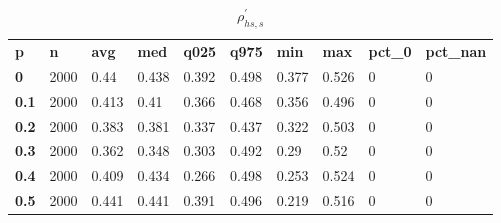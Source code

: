 \begin{table}[h]
 \centering 
\footnotesize
\caption{$\rho_{hs,s}^\prime $}
\label{tab:alphahss}
\begin{tabular}[h]{| l l l l l l l l l l|
    } \hline
\textbf{ p} & \textbf{ n} & \textbf{ avg} & \textbf{ med} & \textbf{ q025} & \textbf{ q975} & \textbf{ min} & \textbf{ max} & \textbf{ pct\_0} & \textbf{ pct\_nan}
           \\
  \textbf{  0} & 2000 &  0.44 & 0.438 & 0.392 & 0.498 & 0.377 & 0.526 & 0 & 0
           \\
  \textbf{0.1} & 2000 & 0.413 &  0.41 & 0.366 & 0.468 & 0.356 & 0.496 & 0 & 0
           \\
  \textbf{0.2} & 2000 & 0.383 & 0.381 & 0.337 & 0.437 & 0.322 & 0.503 & 0 & 0
           \\
  \textbf{0.3} & 2000 & 0.362 & 0.348 & 0.303 & 0.492 &  0.29 &  0.52 & 0 & 0
           \\
  \textbf{0.4} & 2000 & 0.409 & 0.434 & 0.266 & 0.498 & 0.253 & 0.524 & 0 & 0
           \\
  \textbf{0.5} & 2000 & 0.441 & 0.441 & 0.391 & 0.496 & 0.219 & 0.516 & 0 & 0
           \\
 \hline \end{tabular}
 \end{table}

